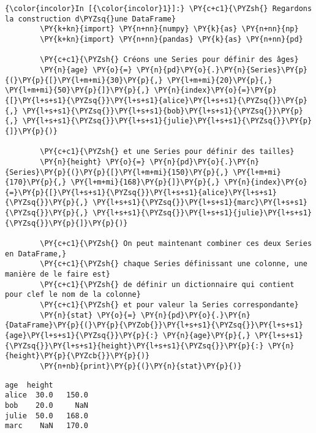     \begin{Verbatim}[commandchars=\\\{\},frame=single,framerule=0.3mm,rulecolor=\color{cellframecolor}]
{\color{incolor}In [{\color{incolor}1}]:} \PY{c+c1}{\PYZsh{} Regardons la construction d\PYZsq{}une DataFrame}
        \PY{k+kn}{import} \PY{n+nn}{numpy} \PY{k}{as} \PY{n+nn}{np}
        \PY{k+kn}{import} \PY{n+nn}{pandas} \PY{k}{as} \PY{n+nn}{pd}
        
        \PY{c+c1}{\PYZsh{} Créons une Series pour définir des âges}
        \PY{n}{age} \PY{o}{=} \PY{n}{pd}\PY{o}{.}\PY{n}{Series}\PY{p}{(}\PY{p}{[}\PY{l+m+mi}{30}\PY{p}{,} \PY{l+m+mi}{20}\PY{p}{,} \PY{l+m+mi}{50}\PY{p}{]}\PY{p}{,} \PY{n}{index}\PY{o}{=}\PY{p}{[}\PY{l+s+s1}{\PYZsq{}}\PY{l+s+s1}{alice}\PY{l+s+s1}{\PYZsq{}}\PY{p}{,} \PY{l+s+s1}{\PYZsq{}}\PY{l+s+s1}{bob}\PY{l+s+s1}{\PYZsq{}}\PY{p}{,} \PY{l+s+s1}{\PYZsq{}}\PY{l+s+s1}{julie}\PY{l+s+s1}{\PYZsq{}}\PY{p}{]}\PY{p}{)}
        
        \PY{c+c1}{\PYZsh{} et une Series pour définir des tailles}
        \PY{n}{height} \PY{o}{=} \PY{n}{pd}\PY{o}{.}\PY{n}{Series}\PY{p}{(}\PY{p}{[}\PY{l+m+mi}{150}\PY{p}{,} \PY{l+m+mi}{170}\PY{p}{,} \PY{l+m+mi}{168}\PY{p}{]}\PY{p}{,} \PY{n}{index}\PY{o}{=}\PY{p}{[}\PY{l+s+s1}{\PYZsq{}}\PY{l+s+s1}{alice}\PY{l+s+s1}{\PYZsq{}}\PY{p}{,} \PY{l+s+s1}{\PYZsq{}}\PY{l+s+s1}{marc}\PY{l+s+s1}{\PYZsq{}}\PY{p}{,} \PY{l+s+s1}{\PYZsq{}}\PY{l+s+s1}{julie}\PY{l+s+s1}{\PYZsq{}}\PY{p}{]}\PY{p}{)}
        
        \PY{c+c1}{\PYZsh{} On peut maintenant combiner ces deux Series en DataFrame,}
        \PY{c+c1}{\PYZsh{} chaque Series définissant une colonne, une manière de le faire est}
        \PY{c+c1}{\PYZsh{} de définir un dictionnaire qui contient pour clef le nom de la colonne}
        \PY{c+c1}{\PYZsh{} et pour valeur la Series correspondante}
        \PY{n}{stat} \PY{o}{=} \PY{n}{pd}\PY{o}{.}\PY{n}{DataFrame}\PY{p}{(}\PY{p}{\PYZob{}}\PY{l+s+s1}{\PYZsq{}}\PY{l+s+s1}{age}\PY{l+s+s1}{\PYZsq{}}\PY{p}{:} \PY{n}{age}\PY{p}{,} \PY{l+s+s1}{\PYZsq{}}\PY{l+s+s1}{height}\PY{l+s+s1}{\PYZsq{}}\PY{p}{:} \PY{n}{height}\PY{p}{\PYZcb{}}\PY{p}{)}
        \PY{n+nb}{print}\PY{p}{(}\PY{n}{stat}\PY{p}{)}
\end{Verbatim}


    \begin{Verbatim}[commandchars=\\\{\},frame=single,framerule=0.3mm,rulecolor=\color{cellframecolor}]
        age  height
alice  30.0   150.0
bob    20.0     NaN
julie  50.0   168.0
marc    NaN   170.0
\end{Verbatim}

